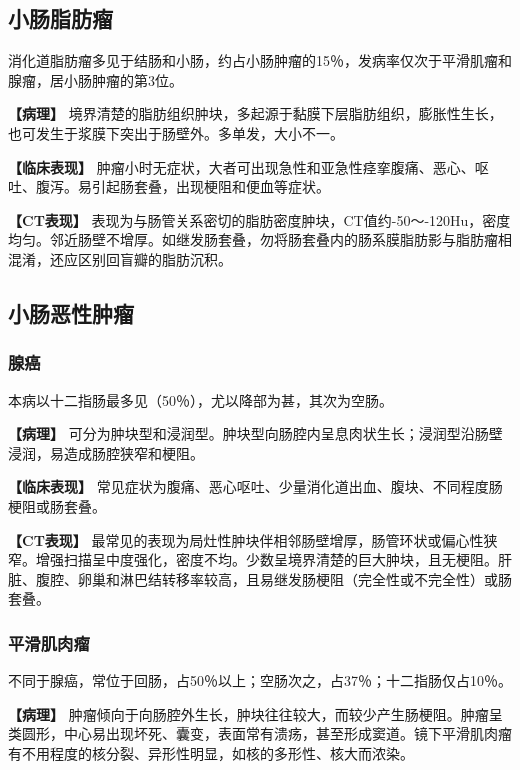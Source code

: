 \subsection{小肠脂肪瘤}

消化道脂肪瘤多见于结肠和小肠，约占小肠肿瘤的15％，发病率仅次于平滑肌瘤和腺瘤，居小肠肿瘤的第3位。

\textbf{【病理】}
境界清楚的脂肪组织肿块，多起源于黏膜下层脂肪组织，膨胀性生长，也可发生于浆膜下突出于肠壁外。多单发，大小不一。

\textbf{【临床表现】}
肿瘤小时无症状，大者可出现急性和亚急性痉挛腹痛、恶心、呕吐、腹泻。易引起肠套叠，出现梗阻和便血等症状。

\textbf{【CT表现】}
表现为与肠管关系密切的脂肪密度肿块，CT值约-50～-120Hu，密度均匀。邻近肠壁不增厚。如继发肠套叠，勿将肠套叠内的肠系膜脂肪影与脂肪瘤相混淆，还应区别回盲瓣的脂肪沉积。

\subsection{小肠恶性肿瘤}

\subsubsection{腺癌}

本病以十二指肠最多见（50％），尤以降部为甚，其次为空肠。

\textbf{【病理】}
可分为肿块型和浸润型。肿块型向肠腔内呈息肉状生长；浸润型沿肠壁浸润，易造成肠腔狭窄和梗阻。

\textbf{【临床表现】}
常见症状为腹痛、恶心呕吐、少量消化道出血、腹块、不同程度肠梗阻或肠套叠。

\textbf{【CT表现】}
最常见的表现为局灶性肿块伴相邻肠壁增厚，肠管环状或偏心性狭窄。增强扫描呈中度强化，密度不均。少数呈境界清楚的巨大肿块，且无梗阻。肝脏、腹腔、卵巢和淋巴结转移率较高，且易继发肠梗阻（完全性或不完全性）或肠套叠。

\subsubsection{平滑肌肉瘤}

不同于腺癌，常位于回肠，占50％以上；空肠次之，占37％；十二指肠仅占10％。

\textbf{【病理】}
肿瘤倾向于向肠腔外生长，肿块往往较大，而较少产生肠梗阻。肿瘤呈类圆形，中心易出现坏死、囊变，表面常有溃疡，甚至形成窦道。镜下平滑肌肉瘤有不用程度的核分裂、异形性明显，如核的多形性、核大而浓染。

